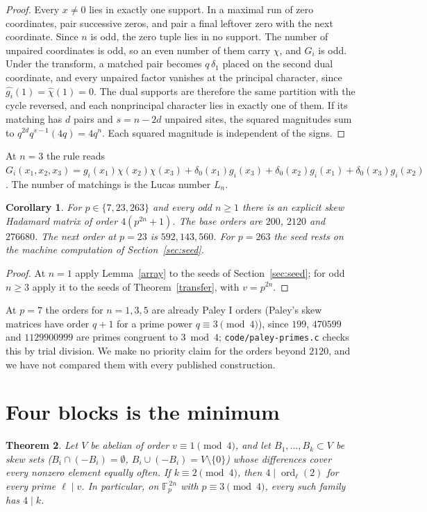 \documentclass[11pt]{article}
\newtheorem{theorem}{Theorem}
\newtheorem{corollary}[theorem]{Corollary}
\theoremstyle{remark}
\newcommand{\F}{\mathbb F}
\begin{document}
\begin{proof}
Every $x\ne0$ lies in exactly one support. In a maximal run of zero coordinates, pair successive zeros, and pair a final leftover zero with the next coordinate. Since $n$ is odd, the zero tuple lies in no support. The number of unpaired coordinates is odd, so an even number of them carry $\chi$, and $G_i$ is odd. Under the transform, a matched pair becomes $q\,\delta_1$ placed on the second dual coordinate, and every unpaired factor vanishes at the principal character, since $\widehat{g_i}(1)=\widehat\chi(1)=0$. The dual supports are therefore the same partition with the cycle reversed, and each nonprincipal character lies in exactly one of them. If its matching has $d$ pairs and $s=n-2d$ unpaired sites, the squared magnitudes sum to $q^{2d}q^{s-1}(4q)=4q^n$. Each squared magnitude is independent of the signs.
\end{proof}

At $n=3$ the rule reads $G_i(x_1,x_2,x_3)=g_i(x_1)\chi(x_2)\chi(x_3)+\delta_0(x_1)g_i(x_3)+\delta_0(x_2)g_i(x_1)+\delta_0(x_3)g_i(x_2)$. The number of matchings is the Lucas number $L_n$.

\begin{corollary}\label{orders}
For $p\in\{7,23,263\}$ and every odd $n\ge1$ there is an explicit skew Hadamard matrix of order $4(p^{2n}+1)$. The base orders are $200$, $2120$ and $276680$. The next order at $p=23$ is $592{,}143{,}560$. For $p=263$ the seed rests on the machine computation of Section~\ref{sec:seed}.
\end{corollary}

\begin{proof}
At $n=1$ apply Lemma~\ref{array} to the seeds of Section~\ref{sec:seed}; for odd $n\ge3$ apply it to the seeds of Theorem~\ref{transfer}, with $v=p^{2n}$.
\end{proof}

At $p=7$ the orders for $n=1,3,5$ are already Paley I orders (Paley's skew matrices have order $q+1$ for a prime power $q\equiv3\pmod4$), since $199$, $470599$ and $1129900999$ are primes congruent to $3\bmod4$; \texttt{code/paley-primes.c} checks this by trial division. We make no priority claim for the orders beyond $2120$, and we have not compared them with every published construction.

\section{Four blocks is the minimum}\label{sec:minimum}
\begin{theorem}\label{minimum}
Let $V$ be abelian of order $v\equiv1\pmod4$, and let $B_1,\dots,B_k\subset V$ be skew sets ($B_i\cap(-B_i)=\emptyset$, $B_i\cup(-B_i)=V\setminus\{0\}$) whose differences cover every nonzero element equally often. If $k\equiv2\pmod4$, then $4\mid\operatorname{ord}_\ell(2)$ for every prime $\ell\mid v$. In particular, on $\F_p^{\,2n}$ with $p\equiv3\pmod4$, every such family has $4\mid k$.
\end{theorem}
\end{document}
